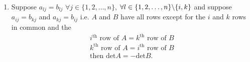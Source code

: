 \documentclass{report}
\begin{document}
\begin{enumerate}[label=(\roman*)]
  \item  Suppose $a_{lj}= b _{lj}$ $\forall j \in \{ 1,2,\ldots , n\} $, $\forall  l \in \{ 1,2,\ldots , n\} \symbol{92}\{ i,k \} $ and suppose $a_{ij}= b _{kj}$ and $a_{kj}= b _{ij}$ i.e. $A$ and $B$ have all rows except for the $i$ and $k$ rows in common and the 
          \begin{align*}
i^{\text{th}} \text{ row of } A = k^{\text{th}} \text{ row of } B\\
k^{\text{th}} \text{ row of } A = i^{\text{th}} \text{ row of } B\\
\text{then } \text{det} A = - \text{det}  B
          .\end{align*}


\end{enumerate}
\end{document}

